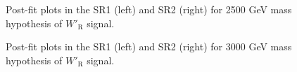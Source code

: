 \begin{figure}[H]
  \centering
  \caption{Post-fit plots in the SR1 (left) and SR2 (right) for 2500 GeV mass hypothesis of $W'_{\text{R}}$ signal.}
  \label{fig:Postfit_WpRH2500_Asimov}
\end{figure}
\begin{figure}[H]
  \centering
  \caption{Post-fit plots in the SR1 (left) and SR2 (right) for 3000 GeV mass hypothesis of $W'_{\text{R}}$ signal.}
  \label{fig:Postfit_WpRH3000_Asimov}
\end{figure}

